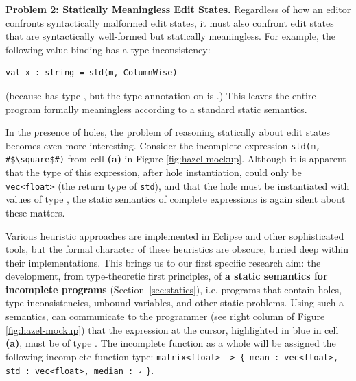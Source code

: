 \vspace{0.25ex}
\noindent\textbf{Problem 2: Statically Meaningless Edit States.} Regardless of how an 
editor confronts syntactically malformed edit states, it must also confront 
edit states that are syntactically well-formed but statically meaningless. For
example, the following value binding has a type inconsistency:
\begin{lstlisting}[numbers=none]
val x : string = std(m, ColumnWise)
\end{lstlisting}
(because  has type ,
but the type annotation on  is .) This leaves the entire program
formally meaningless according to a standard static semantics.

In the presence of holes, the problem of reasoning statically about edit states
becomes even more interesting.  Consider the incomplete expression \lstinline{std(m, #$\square$#)} 
from cell \textbf{(a)} in Figure \ref{fig:hazel-mockup}.
%
%
Although it is apparent that the type of this expression, after hole instantiation, could only be \lstinline{vec<float>} (the return type of \lstinline{std}),
and that the hole must be instantiated with values of type , the static
semantics of complete expressions is again silent about these matters. 

Various heuristic
approaches are implemented in Eclipse and other sophisticated tools, but the 
formal character of these heuristics are obscure, buried deep within their implementations. This brings us to our first specific research aim: the 
development, from type-theoretic first principles, of \textbf{a static semantics for incomplete programs} (Section~\ref{sec:statics}),
i.e. programs that contain holes, type inconsistencies, unbound variables, and
other static problems. Using such a semantics, \HazelEnv can 
communicate to the programmer (see right column of Figure \ref{fig:hazel-mockup}) that the expression at the cursor, highlighted in blue in cell \textbf{(a)}, must be of type . The incomplete function
 as a whole will be assigned the following incomplete function
type: \texttt{matrix<float> -> \{ {mean} : vec<float>, std : vec<float>, median :~$\square$ \}}.


